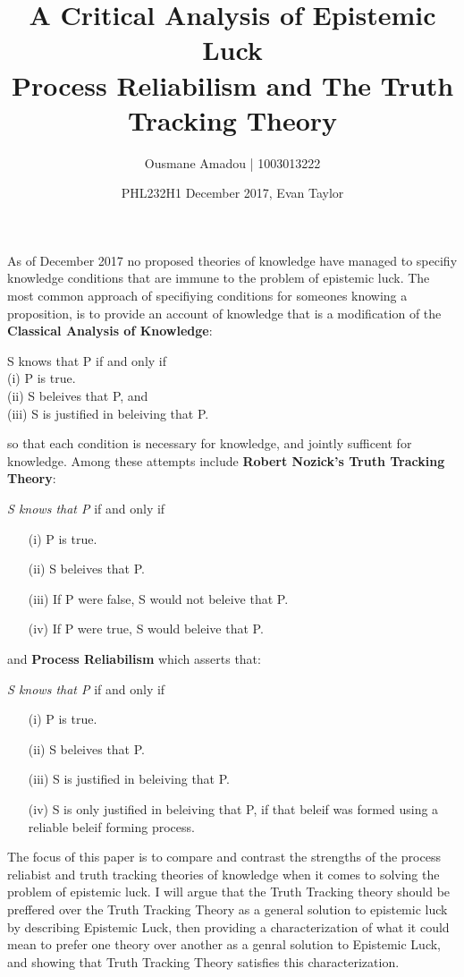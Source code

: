 \documentclass{article}
\title{%
  A Critical Analysis of Epistemic Luck \\
  \large Process Reliabilism and The Truth Tracking Theory }
\author{Ousmane Amadou | 1003013222}
\date{PHL232H1 December 2017, Evan Taylor}
\begin{document}
\maketitle

As of December 2017 no proposed theories of knowledge have managed
to specifiy knowledge conditions that are immune to the problem of
epistemic luck. %
The most common approach of specifiying conditions for someones knowing
a proposition, is to provide an account of knowledge that is a modification
of the \textbf{Classical Analysis of Knowledge}:
\begin{displayquote} %
   S knows that P if and only if \\
  (i) P is true. \\
  (ii) S beleives that P, and \\
  (iii) S is justified in beleiving that P.
\end{displayquote} so that each condition is necessary for knowledge, and jointly
sufficent for knowledge. Among these attempts include \textbf{Robert Nozick's Truth Tracking Theory}:
\begin{displayquote}
  \textit{S knows that P} if and only if
  \begin{enumerate}
      \item[(i)] P is true.
      \item[(ii)] S beleives that P.
      \item[(iii)] If P were false, S would not beleive that P.
      \item[(iv)] If P were true, S would beleive that P.
  \end{enumerate}
\end{displayquote}
and  \textbf{Process Reliabilism} which asserts that:
\begin{displayquote}
  \textit{S knows that P} if and only if
  \begin{enumerate}
      \item[(i)] P is true.
      \item[(ii)] S beleives that P.
      \item[(iii)] S is justified in beleiving that P.
      \item[(iv)] S is only justified in beleiving that P, if that beleif
      was formed using a reliable beleif forming process.
  \end{enumerate}
\end{displayquote}
The focus of this paper is to compare and contrast the strengths of the process
reliabist and truth tracking theories of knowledge when it comes to solving the
problem of epistemic luck. I will argue that the Truth Tracking theory should be
preffered over the Truth Tracking Theory as a general solution to epistemic luck by
describing Epistemic Luck, then providing a characterization of what it could
mean to prefer one theory over another as a genral solution to Epistemic Luck, and
showing that Truth Tracking Theory satisfies this characterization.
\end{document}

